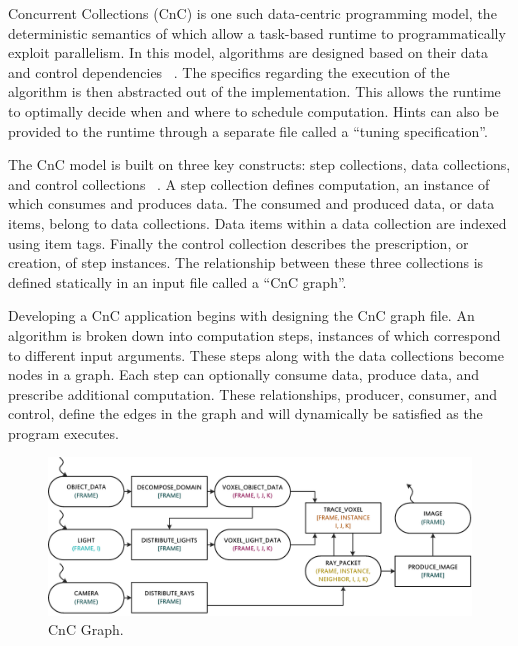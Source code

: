 \documentclass{vgtc}                          %
\begin{document}
Concurrent Collections (CnC) is one such data-centric programming
model, the deterministic semantics of which allow a task-based runtime
to programmatically exploit parallelism. In this model, algorithms are
designed based on their data and control dependencies
~\cite{budimlicconcurrent}. The specifics regarding the execution of
the algorithm is then abstracted out of the implementation. This
allows the runtime to optimally decide when and where to schedule
computation. Hints can also be provided to the runtime through a
separate file called a ``tuning specification''.

The CnC model is built on three key constructs: step collections, data collections, and control collections ~\cite{budimlicconcurrent}.  A step collection defines computation, an instance of which consumes and produces data.  The consumed and produced data, or data items, belong to data collections.  Data items within a data collection are indexed using item tags.
Finally the control collection describes the prescription, or creation, of step instances.  The relationship between these three collections is defined statically in an input file called a ``CnC graph''.

Developing a CnC application begins with designing the CnC graph file.  An algorithm is broken down into computation steps, instances of which correspond to different input arguments.  These steps along with the data collections become nodes in a graph.  Each step can optionally consume data, produce data, and prescribe additional computation.  These relationships, producer, consumer, and control, define the edges in the graph and will dynamically be satisfied as the program executes.

\begin{figure}[!htb]
  \centering
  \includegraphics[width=\textwidth]{drawings/CnC.pdf}
  \caption{CnC Graph.}
  \label{fig:cnc}
\end{figure}
\end{document}

